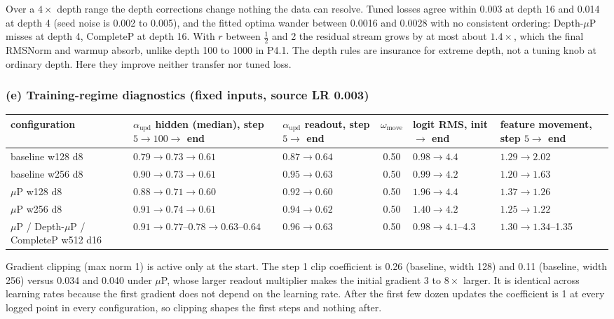 \documentclass[10pt,letterpaper]{article}
\newcommand{\muP}{$\mu$P}
\begin{document}
Over a $4\times$ depth range the depth corrections change nothing the data can resolve. Tuned losses agree within 0.003 at depth 16 and 0.014 at depth 4 (seed noise is 0.002 to 0.005), and the fitted optima wander between 0.0016 and 0.0028 with no consistent ordering: Depth-\muP{} misses at depth 4, CompleteP at depth 16. With $r$ between $\tfrac12$ and 2 the residual stream grows by at most about $1.4\times$, which the final RMSNorm and warmup absorb, unlike depth 100 to 1000 in P4.1. The depth rules are insurance for extreme depth, not a tuning knob at ordinary depth. Here they improve neither transfer nor tuned loss.

\subsubsection*{(e) Training-regime diagnostics (fixed inputs, source LR 0.003)}

\begin{table}[H]\footnotesize
\begin{tabularx}{\textwidth}{>{\raggedright\arraybackslash}p{2.7cm} L L c L L}\toprule
configuration & $\alpha_{\mathrm{upd}}$ hidden (median), step $5\to100\to$ end & $\alpha_{\mathrm{upd}}$ readout, step $5\to$ end & $\omega_{\mathrm{move}}$ & logit RMS, init $\to$ end & feature movement, step $5\to$ end\\\midrule
baseline w128 d8 & $0.79\to0.73\to0.61$ & $0.87\to0.64$ & 0.50 & $0.98\to4.4$ & $1.29\to2.02$\\
baseline w256 d8 & $0.90\to0.73\to0.61$ & $0.95\to0.63$ & 0.50 & $0.99\to4.2$ & $1.20\to1.63$\\
\muP{} w128 d8 & $0.88\to0.71\to0.60$ & $0.92\to0.60$ & 0.50 & $1.96\to4.4$ & $1.37\to1.26$\\
\muP{} w256 d8 & $0.91\to0.74\to0.61$ & $0.94\to0.62$ & 0.50 & $1.40\to4.2$ & $1.25\to1.22$\\
\muP{} / Depth-\muP{} / CompleteP w512 d16 & $0.91\to0.77$--$0.78\to0.63$--$0.64$ & $0.96\to0.63$ & 0.50 & $0.98\to4.1$--4.3 & $1.30\to1.34$--1.35\\\bottomrule
\end{tabularx}
\end{table}

Gradient clipping (max norm 1) is active only at the start. The step 1 clip coefficient is 0.26 (baseline, width 128) and 0.11 (baseline, width 256) versus 0.034 and 0.040 under \muP, whose larger readout multiplier makes the initial gradient 3 to $8\times$ larger. It is identical across learning rates because the first gradient does not depend on the learning rate. After the first few dozen updates the coefficient is 1 at every logged point in every configuration, so clipping shapes the first steps and nothing after.
\end{document}
